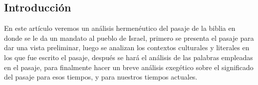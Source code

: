 \begin{multicols}{2}
    \begin{minipage}[t]{0.45\textwidth} %
        \tableofcontents
    \end{minipage}
    \hfill
    \begin{minipage}[t]{0.45\textwidth}
        \section{Introducción}
        En este artículo veremos un análisis hermenéutico del pasaje de la biblia en donde se le da un mandato al pueblo de Israel, primero se presenta el pasaje para dar una vista preliminar, luego se analizan los contextos culturales y literales en los que fue escrito el pasaje, después se hará el análisis de las palabras empleadas en el pasaje, para finalmente hacer un breve análisis exegético sobre el significado del pasaje para esos tiempos, y para nuestros tiempos actuales.
    \end{minipage}
\end{multicols}